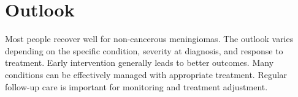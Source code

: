 \section{Outlook}
Most people recover well for non-cancerous meningiomas. The outlook varies depending on the specific condition, severity at diagnosis, and response to treatment. Early intervention generally leads to better outcomes. Many conditions can be effectively managed with appropriate treatment. Regular follow-up care is important for monitoring and treatment adjustment.
